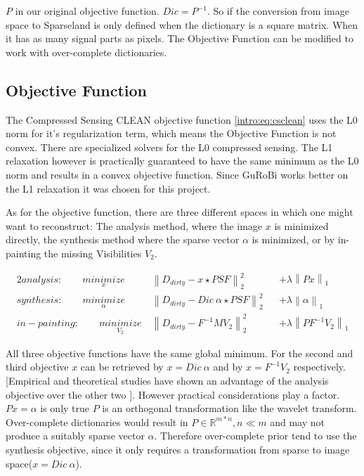 $P$ in our original objective function. $Dic = P^{-1}$. So if the conversion from image space to Sparseland is only defined when the dictionary is a square matrix. When it has as many signal parts as pixels. The Objective Function can be modified to work with over-complete dictionaries.


\subsection{Objective Function}
The Compressed Sensing CLEAN objective function \eqref{intro:eq:csclean} uses the L0 norm for it's regularization term, which means the Objective Function is not convex. There are specialized solvers for the L0 compressed sensing. The L1 relaxation however is practically guaranteed to have the same minimum as the L0 norm and results in a convex objective function. Since GuRoBi works better on the L1 relaxation it was chosen for this project.

As for the objective function, there are three different spaces in which one might want to reconstruct: The analysis method, where the image $x$ is minimized directly, the synthesis method where the sparse vector $\alpha$ is minimized, or by in-painting the missing Visibilities $V_2$.

\begin{alignat*}{2}
	analysis:\qquad \underset{x}{minimize} \:& \left \| D_{dirty} - x \star PSF \right \|_2^2 &&+  \lambda \left \| Px \right \|_1 \\
	synthesis:\qquad \underset{\alpha}{minimize} \:& \left \| D_{dirty} - Dic \: \alpha \star PSF \right \|_2^2 &&+ \lambda \left \| \alpha \right \|_1 \\
	in-painting:\qquad \underset{V_2}{minimize} \:& \left \| D_{dirty} - F^{-1} M V_2 \right \|_2^2 &&+ \lambda \left \| PF^{-1}V_2\right \|_1
\end{alignat*}

All three objective functions have the same global minimum. For the second and third objective $x$ can be retrieved by $x = Dic\:\alpha$ and by $x = F^{-1}V_2$ respectively. [Empirical and theoretical studies have shown an advantage of the analysis objective over the other two \cite{something}]. However practical considerations play a factor. $Px = \alpha$ is only true $P$ is an orthogonal transformation like the wavelet transform. Over-complete dictionaries would result in $P \in \mathbb{R}^{m*n}, n \ll m$ and may not produce a suitably sparse vector $\alpha$. Therefore over-complete prior tend to use the synthesis objective, since it only requires a transformation from sparse to image space($x = Dic\:\alpha$).

